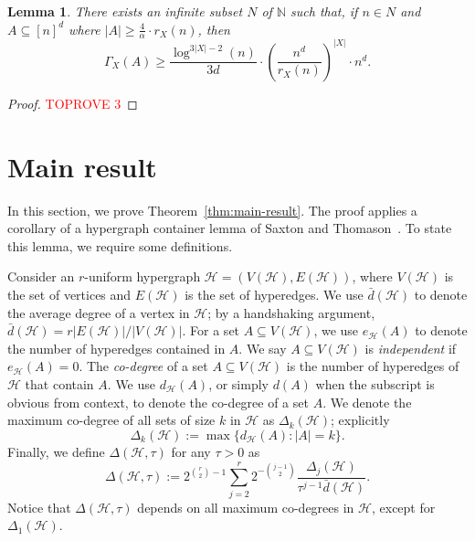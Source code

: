 \documentclass[12pt]{article}
\numberwithin{equation}{section}
\newtheorem{lem}[equation]{Lemma}
\theoremstyle{definition}
\theoremstyle{remark}
\begin{document}
\begin{lem}\label{lem:supersat-seq}
There exists an infinite subset $N$ of $\mathbb{N}$ such that, if $n\in N$ and $A\subseteq [n]^d$ where $|A|\geq \frac{4}{\alpha}\cdot r_X(n)$, then 
\[\Gamma_X(A) \geq \frac{\log^{3|X|-2}(n)}{3d}\cdot\left(\frac{n^d}{r_X(n)}\right)^{|X|}\cdot n^d.\]
\end{lem}

\begin{proof}\textcolor{red}{TOPROVE 3}\end{proof}

    
\section{Main result}\label{sect:mainresult}

In this section, we prove Theorem~\ref{thm:main-result}. The proof applies a corollary of a hypergraph container lemma of Saxton and Thomason~\cite{saxton}. To state this lemma, we require some definitions.  

Consider an $r$-uniform hypergraph $\mathcal{H} = (V(\mathcal{H}), E(\mathcal{H}))$, where $V(\mathcal{H})$ is the set of vertices and $E(\mathcal{H})$ is the set of hyperedges. We use $\bar{d}(\mathcal{H})$ to denote the average degree of a vertex in $\mathcal{H}$; by a handshaking argument, $\bar{d}(\mathcal{H})=r|E(\mathcal{H})|/|V(\mathcal{H})|$. For a set $A\subseteq V(\mathcal{H})$, we use $e_\mathcal{H}(A)$ to denote the number of hyperedges contained in $A$. We say $A \subseteq V(\mathcal{H})$ is \emph{independent} if $e_\mathcal{H}(A) = 0$. The \emph{co-degree} of a set $A \subseteq V(\mathcal{H})$ is the number of hyperedges of $\mathcal{H}$ that contain $A$. We use $d_{\mathcal{H}}(A)$, or simply $d(A)$ when the subscript is obvious from context, to denote the co-degree of a set $A$.  We denote the maximum co-degree of all sets of size $k$ in $\mathcal{H}$ as $\Delta_k(\mathcal{H})$; explicitly \[\Delta_k(\mathcal{H}) := \max\{d_{\mathcal{H}}(A): |A| = k\}.\] Finally, we define $\Delta(\mathcal{H}, \tau)$ for any $\tau > 0$ as \[\Delta(\mathcal{H}, \tau) := 2^{\binom{r}{2} - 1} \sum_{j=2}^r 2^{-\binom{j-1}{2}} \frac{\Delta_j(\mathcal{H})}{\tau^{j-1}\bar{d}(\mathcal{H})}. \] Notice that $\Delta(\mathcal{H}, \tau)$ depends on all maximum co-degrees in $\mathcal{H}$, except for $\Delta_1(\mathcal{H})$. 
\end{document}
